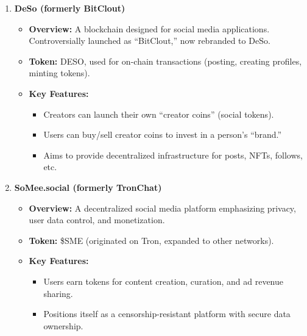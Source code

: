 \documentclass{article}
\begin{document}
\begin{itemize}
\begin{enumerate}
        \item \textbf{DeSo (formerly BitClout)}
          \begin{itemize}
            \item \textbf{Overview:} A blockchain designed for social media applications. Controversially launched as ``BitClout,'' now rebranded to DeSo.
            \item \textbf{Token:} DESO, used for on-chain transactions (posting, creating profiles, minting tokens).
            \item \textbf{Key Features:}
              \begin{itemize}
                \item Creators can launch their own ``creator coins'' (social tokens).
                \item Users can buy/sell creator coins to invest in a person’s ``brand.''
                \item Aims to provide decentralized infrastructure for posts, NFTs, follows, etc.
              \end{itemize}
          \end{itemize}

        \item \textbf{SoMee.social (formerly TronChat)}
          \begin{itemize}
            \item \textbf{Overview:} A decentralized social media platform emphasizing privacy, user data control, and monetization.
            \item \textbf{Token:} \$SME (originated on Tron, expanded to other networks).
            \item \textbf{Key Features:}
              \begin{itemize}
                \item Users earn tokens for content creation, curation, and ad revenue sharing.
                \item Positions itself as a censorship-resistant platform with secure data ownership.
              \end{itemize}
          \end{itemize}


\end{enumerate}
\end{itemize}
\end{document}
